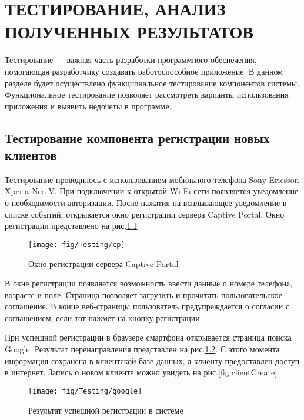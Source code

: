 \chapter{ТЕСТИРОВАНИЕ, АНАЛИЗ ПОЛУЧЕННЫХ РЕЗУЛЬТАТОВ}

Тестирование --- важная часть разработки программного обеспечения, помогающая разработчику создавать работоспособное приложение. В данном разделе будет осуществлено функциональное тестирование компонентов системы. Функциональное тестирование позволяет рассмотреть варианты использования приложения и выявить недочеты в программе.

\section{Тестирование компонента регистрации новых клиентов}

Тестирование проводилось с использованием мобильного телефона Sony Ericsson Xperia Neo V.
При подключении к открытой Wi-Fi сети появляется уведомление о необходимости авторизации. После нажатия на всплывающее уведомление в списке событий, открывается окно регистрации сервера Captive Portal. Окно регистрации представлено на рис.\ref{fig:cp}

\begin{figure}[h]
	\centering
	\texttt{[image: fig/Testing/cp]}
	\caption{Окно регистрации сервера Captive Portal}
	\label{fig:cp}
\end{figure}

В окне регистрации появляется возможность ввести данные о номере телефона, возрасте и поле. Страница позволяет загрузить и прочитать пользовательское соглашение. В конце веб-страницы пользователь предупреждается о согласии с соглашением, если тот нажмет на кнопку регистрации. 

При успешной регистрации в браузере смартфона открывается страница поиска Google. Результат перенаправления представлен на рис.\ref{fig:google}. С этого момента информация сохранена в клиентской базе данных, а клиенту предоставлен доступ в интернет. Запись о новом клиенте можно увидеть на рис.\ref{fig:clientCreate}.

\begin{figure}[h]
	\centering
	\texttt{[image: fig/Testing/google]}
	\caption{Результат успешной регистрации в системе}
	\label{fig:google}
\end{figure}

